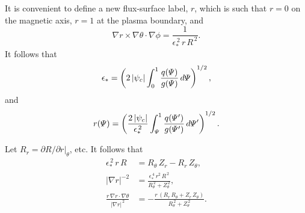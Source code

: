 \documentclass[12pt,prb,aps,notitlepage]{revtex4-1}
\begin{document}
It is convenient to define a new flux-surface label, $r$, which is such that
$r=0$ on the magnetic axis, $r=1$ at the plasma boundary, and
\begin{equation}
\nabla r\times \nabla\theta\cdot\nabla\phi = \frac{1}{\epsilon_\ast^{\,2}\,r\,R^{\,2}}.
\end{equation}
It follows that
\begin{equation}
\epsilon_\ast =\left( 2\,|\psi_c|\int_0^1\frac{q({\mit\Psi})}{g({\mit\Psi})}\,d{\mit\Psi}\right)^{1/2},
\end{equation}
and
\begin{equation}
r({\mit\Psi})= \left(\frac{2\,|\psi_c|}{\epsilon_\ast^{\,2}}\int_{\mit\Psi}^1 \frac{q({\mit\Psi}')}{g({\mit\Psi}')}\,d{\mit\Psi}'\right)^{1/2}.
\end{equation}

Let $R_r=\left.\partial R/\partial r\right|_\theta$, etc. It follows that
\begin{align}
\epsilon_\ast^{\,2}\,r\,R&= R_\theta\,Z_r-R_r\,Z_\theta,\\[0.5ex]
|\nabla r|^{-2} &= \frac{\epsilon_\ast^{\,4}\,r^2\,R^{\,2}}{R_\theta^{\,2} + Z_\theta^{\,2}},\\[0.5ex]
\frac{r\,\nabla r\cdot\nabla\theta}{|\nabla r|^{\,2}} &= -\frac{r\,(R_r\,R_\theta + Z_r\,Z_\theta)}{R_\theta^{\,2}+Z_\theta^{\,2}}.
\end{align}
\end{document}
